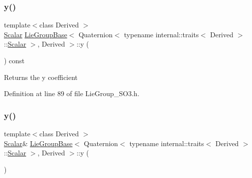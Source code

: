 \subsubsection{\texorpdfstring{y()}{y()}\hspace{0.1cm}{\footnotesize\ttfamily [1/2]}}
{\footnotesize\ttfamily template$<$class Derived $>$ \\
\hyperlink{class_lie_group_base_3_01_quaternion_3_01typename_01internal_1_1traits_3_01_derived_01_4_1_1_scalar_01_4_00_01_derived_01_4_afadeceb3b98e52deecc572e71efb82a8}{Scalar} \hyperlink{class_lie_group_base}{Lie\+Group\+Base}$<$ Quaternion$<$ typename internal\+::traits$<$ Derived $>$\+::\hyperlink{class_lie_group_base_3_01_quaternion_3_01typename_01internal_1_1traits_3_01_derived_01_4_1_1_scalar_01_4_00_01_derived_01_4_afadeceb3b98e52deecc572e71efb82a8}{Scalar} $>$, Derived $>$\+::y (\begin{DoxyParamCaption}{ }\end{DoxyParamCaption}) const\hspace{0.3cm}{\ttfamily [inline]}}

\begin{DoxyReturn}{Returns}
the {\ttfamily y} coefficient 
\end{DoxyReturn}


Definition at line 89 of file Lie\+Group\+\_\+\+S\+O3.\+h.

\hypertarget{class_lie_group_base_3_01_quaternion_3_01typename_01internal_1_1traits_3_01_derived_01_4_1_1_scalar_01_4_00_01_derived_01_4_ac6aa32bb8b384f5c4607f4d6448d09d9}{}\label{class_lie_group_base_3_01_quaternion_3_01typename_01internal_1_1traits_3_01_derived_01_4_1_1_scalar_01_4_00_01_derived_01_4_ac6aa32bb8b384f5c4607f4d6448d09d9} 
\subsubsection{\texorpdfstring{y()}{y()}\hspace{0.1cm}{\footnotesize\ttfamily [2/2]}}
{\footnotesize\ttfamily template$<$class Derived $>$ \\
\hyperlink{class_lie_group_base_3_01_quaternion_3_01typename_01internal_1_1traits_3_01_derived_01_4_1_1_scalar_01_4_00_01_derived_01_4_afadeceb3b98e52deecc572e71efb82a8}{Scalar}\& \hyperlink{class_lie_group_base}{Lie\+Group\+Base}$<$ Quaternion$<$ typename internal\+::traits$<$ Derived $>$\+::\hyperlink{class_lie_group_base_3_01_quaternion_3_01typename_01internal_1_1traits_3_01_derived_01_4_1_1_scalar_01_4_00_01_derived_01_4_afadeceb3b98e52deecc572e71efb82a8}{Scalar} $>$, Derived $>$\+::y (\begin{DoxyParamCaption}{ }\end{DoxyParamCaption})\hspace{0.3cm}{\ttfamily [inline]}}

